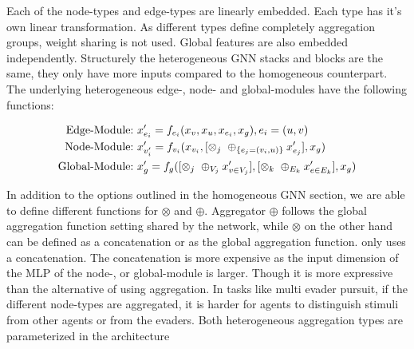 Each of the node-types and edge-types are linearly embedded. Each type has it's own linear transformation. As different types define completely aggregation groups, weight sharing is not used. Global features are also embedded independently. Structurely the heterogeneous GNN stacks and blocks are the same, they only have more inputs compared to the homogeneous counterpart. The underlying heterogeneous edge-, node- and global-modules have the following functions:

\begin{equation}
    \begin{aligned}
        \textup{Edge-Module:}\ & x'_{e_i} = f_{e_i}(x_v, x_u, x_{e_i}, x_g), e_i = (u, v)\\
        \textup{Node-Module:}\ & x'_{v'_i} = f_{v_i}(x_{v_i}, [\otimes_j\ \oplus_{\{e_j=(v_i,u)\}} x'_{e_j}], x_g)\\
        \textup{Global-Module:}\ & x'_{g} = f_g([\otimes_j\ \oplus_{V_j} x'_{v\in V_j}], [\otimes_k\ \oplus_{E_k} x'_{e\in E_k}], x_g)
    \end{aligned}
    \nonumber
\end{equation}

In addition to the options outlined in the homogeneous GNN section, we are able to define different functions for $\otimes$ and $\oplus$. Aggregator $\oplus$ follows the global aggregation function setting shared by the network, while $\otimes$ on the other hand can be defined as a concatenation or as the global aggregation function.  only uses a concatenation. The concatenation is more expensive as the input dimension of the MLP of the node-, or global-module is larger. Though it is more expressive than the alternative of using aggregation. In tasks like multi evader pursuit, if the different node-types are aggregated, it is harder for agents to distinguish stimuli from other agents or from the evaders. Both heterogeneous aggregation types are parameterized in the architecture

